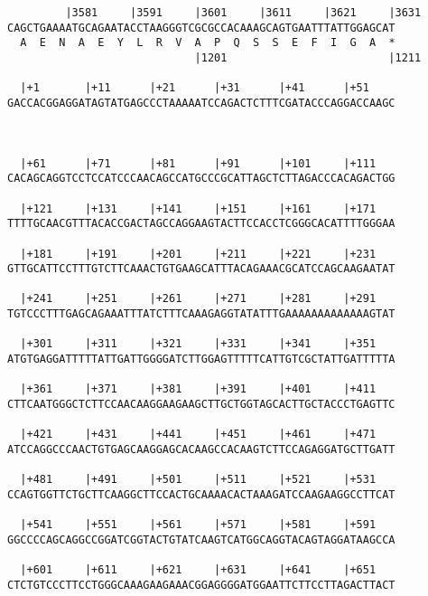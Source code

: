 \documentclass{article}
\begin{document}
{\begin{Verbatim}
         |3581     |3591     |3601     |3611     |3621     |3631
CAGCTGAAAATGCAGAATACCTAAGGGTCGCGCCACAAAGCAGTGAATTTATTGGAGCAT
  A  E  N  A  E  Y  L  R  V  A  P  Q  S  S  E  F  I  G  A  *
                             |1201                         |1211
  
  |+1       |+11      |+21      |+31      |+41      |+51    
GACCACGGAGGATAGTATGAGCCCTAAAAATCCAGACTCTTTCGATACCCAGGACCAAGC
   
                                                            
  
  |+61      |+71      |+81      |+91      |+101     |+111   
CACAGCAGGTCCTCCATCCCAACAGCCATGCCCGCATTAGCTCTTAGACCCACAGACTGG
                                                            
  |+121     |+131     |+141     |+151     |+161     |+171   
TTTTGCAACGTTTACACCGACTAGCCAGGAAGTACTTCCACCTCGGGCACATTTTGGGAA
                                                            
  |+181     |+191     |+201     |+211     |+221     |+231   
GTTGCATTCCTTTGTCTTCAAACTGTGAAGCATTTACAGAAACGCATCCAGCAAGAATAT
                                                            
  |+241     |+251     |+261     |+271     |+281     |+291   
TGTCCCTTTGAGCAGAAATTTATCTTTCAAAGAGGTATATTTGAAAAAAAAAAAAAGTAT
                                                            
  |+301     |+311     |+321     |+331     |+341     |+351   
ATGTGAGGATTTTTATTGATTGGGGATCTTGGAGTTTTTCATTGTCGCTATTGATTTTTA
                                                            
  |+361     |+371     |+381     |+391     |+401     |+411   
CTTCAATGGGCTCTTCCAACAAGGAAGAAGCTTGCTGGTAGCACTTGCTACCCTGAGTTC
                                                            
  |+421     |+431     |+441     |+451     |+461     |+471   
ATCCAGGCCCAACTGTGAGCAAGGAGCACAAGCCACAAGTCTTCCAGAGGATGCTTGATT
                                                            
  |+481     |+491     |+501     |+511     |+521     |+531   
CCAGTGGTTCTGCTTCAAGGCTTCCACTGCAAAACACTAAAGATCCAAGAAGGCCTTCAT
                                                            
  |+541     |+551     |+561     |+571     |+581     |+591   
GGCCCCAGCAGGCCGGATCGGTACTGTATCAAGTCATGGCAGGTACAGTAGGATAAGCCA
                                                            
  |+601     |+611     |+621     |+631     |+641     |+651   
CTCTGTCCCTTCCTGGGCAAAGAAGAAACGGAGGGGATGGAATTCTTCCTTAGACTTACT
                                                            

\end{Verbatim}}
\end{document}
